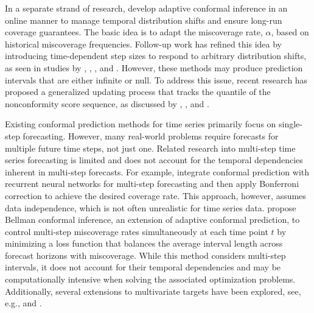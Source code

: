 \documentclass[
  11pt,
  a4paper,
]{article}
\theoremstyle{plain}
\theoremstyle{remark}
\begin{document}
In a separate strand of research, \textcite{gibbs2021} develop adaptive
conformal inference in an online manner to manage temporal distribution
shifts and ensure long-run coverage guarantees. The basic idea is to
adapt the miscoverage rate, \(\alpha\), based on historical miscoverage
frequencies. Follow-up work has refined this idea by introducing
time-dependent step sizes to respond to arbitrary distribution shifts,
as seen in studies by \textcite{bastani2022}, \textcite{zaffran2022},
\textcite{gibbs2024}, and \textcite{angelopoulos2024online}. However,
these methods may produce prediction intervals that are either infinite
or null. To address this issue, recent research has proposed a
generalized updating process that tracks the quantile of the
nonconformity score sequence, as discussed by \textcite{bhatnagar2023},
\textcite{angelopoulos2024}, and \textcite{angelopoulos2024online}.

Existing conformal prediction methods for time series primarily focus on
single-step forecasting. However, many real-world problems require
forecasts for multiple future time steps, not just one. Related research
into multi-step time series forecasting is limited and does not account
for the temporal dependencies inherent in multi-step forecasts. For
example, \textcite{stankeviciute2021} integrate conformal prediction
with recurrent neural networks for multi-step forecasting and then apply
Bonferroni correction to achieve the desired coverage rate. This
approach, however, assumes data independence, which is not often
unrealistic for time series data. \textcite{yang2024ts} propose Bellman
conformal inference, an extension of adaptive conformal prediction, to
control multi-step miscoverage rates simultaneously at each time point
\(t\) by minimizing a loss function that balances the average interval
length across forecast horizons with miscoverage. While this method
considers multi-step intervals, it does not account for their temporal
dependencies and may be computationally intensive when solving the
associated optimization problems. Additionally, several extensions to
multivariate targets have been explored, see, e.g.,
\textcite{schlembach2022} and \textcite{sun2022}.
\end{document}
